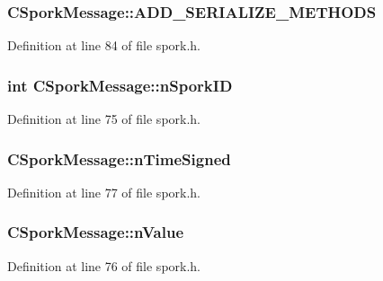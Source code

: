 \subsubsection[{A\+D\+D\+\_\+\+S\+E\+R\+I\+A\+L\+I\+Z\+E\+\_\+\+M\+E\+T\+H\+O\+D\+S}]{\setlength{\rightskip}{0pt plus 5cm}C\+Spork\+Message\+::\+A\+D\+D\+\_\+\+S\+E\+R\+I\+A\+L\+I\+Z\+E\+\_\+\+M\+E\+T\+H\+O\+D\+S}\label{class_c_spork_message_afcbd5a0f8bdeebe3794088bf29136071}


Definition at line 84 of file spork.\+h.

\hypertarget{class_c_spork_message_a081216533339aed53adbb0dad2a78f73}{}
\subsubsection[{n\+Spork\+I\+D}]{\setlength{\rightskip}{0pt plus 5cm}int C\+Spork\+Message\+::n\+Spork\+I\+D}\label{class_c_spork_message_a081216533339aed53adbb0dad2a78f73}


Definition at line 75 of file spork.\+h.

\hypertarget{class_c_spork_message_a66a80692ffda8526efa272bb2847030b}{}
\subsubsection[{n\+Time\+Signed}]{ C\+Spork\+Message\+::n\+Time\+Signed}\label{class_c_spork_message_a66a80692ffda8526efa272bb2847030b}


Definition at line 77 of file spork.\+h.

\hypertarget{class_c_spork_message_ae15a1fa999993177b2549c4316c89643}{}
\subsubsection[{n\+Value}]{ C\+Spork\+Message\+::n\+Value}\label{class_c_spork_message_ae15a1fa999993177b2549c4316c89643}


Definition at line 76 of file spork.\+h.

